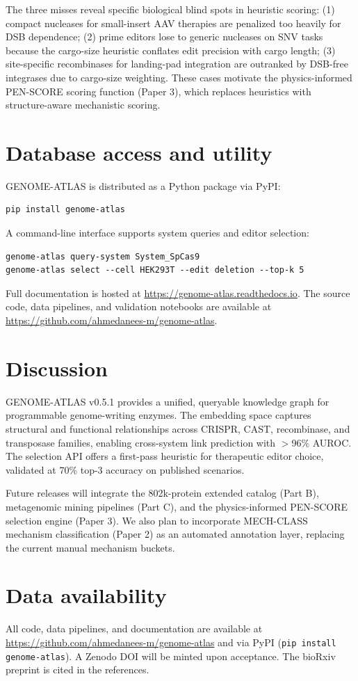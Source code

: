 \documentclass[11pt,a4paper]{article}
\begin{document}
The three misses reveal specific biological blind spots in heuristic scoring: (1) compact nucleases for small-insert AAV therapies are penalized too heavily for DSB dependence; (2) prime editors lose to generic nucleases on SNV tasks because the cargo-size heuristic conflates edit precision with cargo length; (3) site-specific recombinases for landing-pad integration are outranked by DSB-free integrases due to cargo-size weighting. These cases motivate the physics-informed PEN-SCORE scoring function (Paper 3), which replaces heuristics with structure-aware mechanistic scoring.

\section*{Database access and utility}

GENOME-ATLAS is distributed as a Python package via PyPI:
\begin{verbatim}
pip install genome-atlas
\end{verbatim}
A command-line interface supports system queries and editor selection:
\begin{verbatim}
genome-atlas query-system System_SpCas9
genome-atlas select --cell HEK293T --edit deletion --top-k 5
\end{verbatim}
Full documentation is hosted at \url{https://genome-atlas.readthedocs.io}. The source code, data pipelines, and validation notebooks are available at \url{https://github.com/ahmedanees-m/genome-atlas}.

\section*{Discussion}

GENOME-ATLAS v0.5.1 provides a unified, queryable knowledge graph for programmable genome-writing enzymes. The embedding space captures structural and functional relationships across CRISPR, CAST, recombinase, and transposase families, enabling cross-system link prediction with $>$96\% AUROC. The selection API offers a first-pass heuristic for therapeutic editor choice, validated at 70\% top-3 accuracy on published scenarios.

Future releases will integrate the 802k-protein extended catalog (Part B), metagenomic mining pipelines (Part C), and the physics-informed PEN-SCORE selection engine (Paper 3). We also plan to incorporate MECH-CLASS mechanism classification (Paper 2) as an automated annotation layer, replacing the current manual mechanism buckets.

\section*{Data availability}
All code, data pipelines, and documentation are available at \url{https://github.com/ahmedanees-m/genome-atlas} and via PyPI (\texttt{pip install genome-atlas}). A Zenodo DOI will be minted upon acceptance. The bioRxiv preprint is cited in the references.



\end{document}
